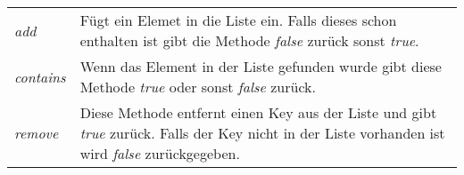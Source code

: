 \documentclass[10pt,a4paper,titlepage,oneside]{article}
\begin{document}
\begin{table}[H]
    \begin{tabularx}{\textwidth}{lX}
        \textit{add} & Fügt ein Elemet in die Liste ein. Falls dieses schon enthalten ist gibt die Methode \textit{false} zurück sonst \textit{true}. \\
        \textit{contains} & Wenn das Element in der Liste gefunden wurde gibt diese Methode \textit{true} oder sonst \textit{false} zurück. \\
        \textit{remove} & Diese Methode entfernt einen Key aus der Liste und gibt \textit{true} zurück. Falls der Key nicht in der Liste vorhanden ist wird \textit{false} zurückgegeben. \\
    \end{tabularx}
\end{table}




 
 




		
\end{document}
